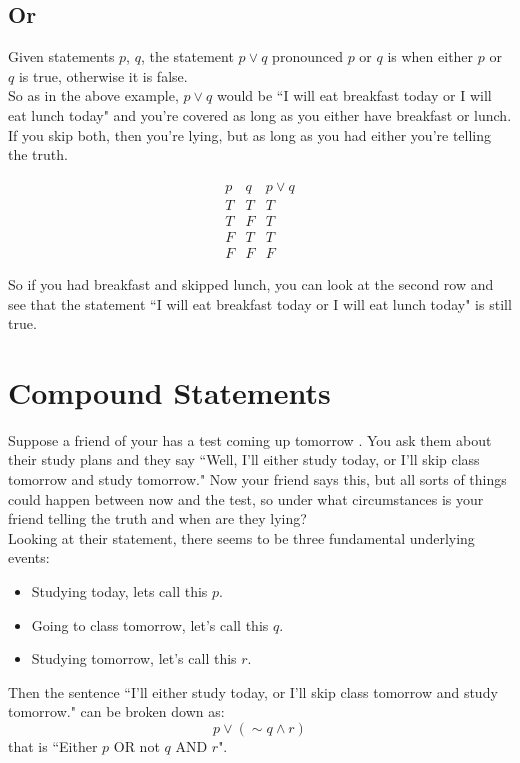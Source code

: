 \documentclass[10pt]{article}
\theoremstyle{definition}
\begin{document}
\subsection{Or}

Given statements $p$, $q$, the statement $p\vee q$ pronounced $p$ or $q$ is when either $p$ or $q$ is true, otherwise it is false.\\

So as in the above example, $p\vee q$ would be ``I will eat breakfast today or I will eat lunch today" and you're covered as long as you either have breakfast or lunch.  If you skip both, then you're lying, but as long as you had either you're telling the truth.

$$\begin{array}{c|c|c}
p&q&p\vee q\\
\hline
T & T&T\\
T&F&T\\
F&T&T\\
F&F&F
\end{array}$$

So if you had breakfast and skipped lunch, you can look at the second row and see that the statement ``I will eat breakfast today or I will eat lunch today" is still true.


\section{Compound Statements}

Suppose a friend of your has a test coming up tomorrow .  You ask them about their study plans and they say ``Well, I'll either study today, or I'll skip class tomorrow and study tomorrow."  Now your friend says this, but all sorts of things could happen between now and the test, so under what circumstances is your friend telling the truth and when are they lying?\\

Looking at their statement, there seems to be three fundamental underlying events:

\begin{itemize}
\item Studying today, lets call this $p$.
\item Going to class tomorrow, let's call this $q$.
\item Studying tomorrow, let's call this $r$.
\end{itemize}

Then the sentence ``I'll either study today, or I'll skip class tomorrow and study tomorrow." can be broken down as: $$p\vee (\sim q \wedge r)$$ that is ``Either $p$ OR not $q$ AND $r$".  \\
\end{document}
